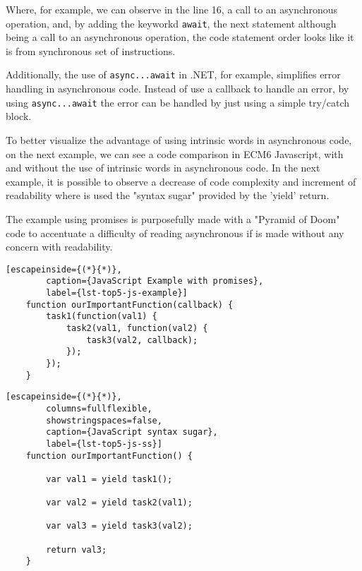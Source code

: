 	Where, for example, we can observe in the line 16, a call to an asynchronous operation, and, by adding the keyworkd \texttt{await}, the next statement although being a call to an asynchronous operation, the code statement order looks like it is from synchronous set of instructions. 
	
	Additionally, the use of \texttt{async...await} in .NET, for example, simplifies error handling in asynchronous code. Instead of use a callback to handle an error, by using \texttt{async...await} the error can be handled by just using a simple try/catch block. 

	
	To better visualize the advantage of using intrinsic words in asynchronous code, on the next example, we can see a code comparison in ECM6 Javascript, with and without the use of intrinsic words in asynchronous code. 
	In the next example, it is possible to observe a decrease of code complexity and increment of readability where is used the "syntax sugar" provided by the 'yield' return. 
	
	The example using promises is purposefully made with a "Pyramid of Doom" code to accentuate a difficulty of reading asynchronous if is made without any concern with readability.
	\noindent
	\hspace*{-0.08\textwidth}
	\begin{minipage}[t]{.46\textwidth}
	\lstset{basicstyle=\scriptsize\ttfamily,frame=bottomline}
	\begin{lstlisting}[escapeinside={(*}{*)},
		caption={JavaScript Example with promises},
		label={lst-top5-js-example}]
	function ourImportantFunction(callback) {
		task1(function(val1) {
			task2(val1, function(val2) {
				task3(val2, callback);
			});
		});
	}
	\end{lstlisting}
	\end{minipage}%
	\hspace{0.06\textwidth} %
	\begin{minipage}[t]{.48\textwidth}
	\lstset{basicstyle=\scriptsize\ttfamily,frame=bottomline}
	\begin{lstlisting}[escapeinside={(*}{*)},
		columns=fullflexible,
		showstringspaces=false,
		caption={JavaScript syntax sugar},
		label={lst-top5-js-ss}]
	function ourImportantFunction() {
		
		var val1 = yield task1();
		
		var val2 = yield task2(val1);
		
		var val3 = yield task3(val2);
	
		return val3;
	}
	\end{lstlisting}
	\end{minipage}

